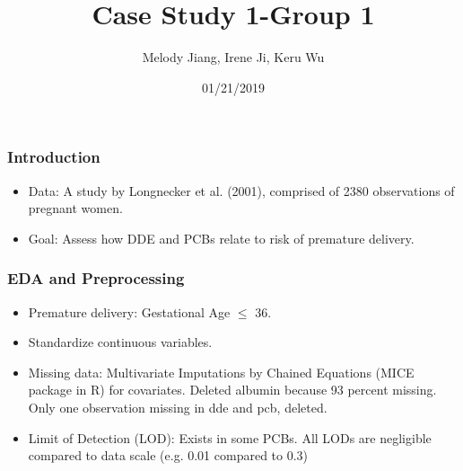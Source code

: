 \documentclass{beamer}
\title{Case Study 1-Group 1}
\author{Melody Jiang, Irene Ji, Keru Wu}
\institute{Department of Statistical Science, Duke University}
\date{01/21/2019}
\begin{document}
\frame{\titlepage}





\begin{frame}
\frametitle{Introduction}

\begin{itemize}
\item Data: A study by Longnecker et al. (2001), comprised of 2380 observations of pregnant women.
  
\item Goal: Assess how DDE and PCBs relate to risk of premature delivery.

\end{itemize}

\end{frame}







\begin{frame}
\frametitle{EDA and Preprocessing}
\begin{itemize}
\item Premature delivery: Gestational Age $\leq$ 36.
\item Standardize continuous variables.
\item Missing data: Multivariate Imputations by Chained Equations (MICE package in R) for covariates. Deleted albumin because 93 percent missing. Only one observation missing in dde and pcb, deleted.
\item Limit of Detection (LOD): Exists in some PCBs. All LODs are negligible compared to data scale (e.g. 0.01 compared to 0.3)
\end{itemize}
\end{frame}
\end{document}
